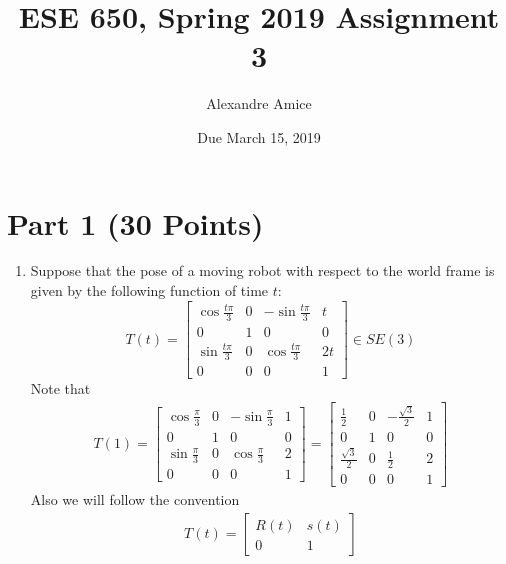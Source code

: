 \documentclass{article}
\title{ESE 650, Spring 2019 Assignment 3}
\date{Due March 15, 2019}
\author{Alexandre Amice}
\begin{document}
\maketitle

\section{Part 1 (30 Points)}

 
\begin{enumerate} 
  \item   Suppose that the pose of a moving robot with respect to the world frame is given by the following function of time $t$:
  \[
  T(t) = \begin{bmatrix}
    \cos\frac{t\pi}{3}  & 0 & -\sin\frac{t\pi}{3} & t\\
    0  &  1 &  0 &0\\
    \sin\frac{t\pi}{3} &  0 & \cos\frac{t\pi}{3} & 2t\\
    0 & 0 & 0 & 1
  \end{bmatrix} \in SE(3)
  \]
  Note that 
  \begin{align*}
   T(1) = \begin{bmatrix}
    \cos\frac{\pi}{3}  & 0 & -\sin\frac{\pi}{3} & 1\\
    0  &  1 &  0 &0\\
    \sin\frac{\pi}{3} &  0 & \cos\frac{\pi}{3} & 2\\
    0 & 0 & 0 & 1
  \end{bmatrix} = \begin{bmatrix}
    \frac{1}{2}  & 0 & -\frac{\sqrt{3}}{2} & 1\\
    0  &  1 &  0 &0\\
    \frac{\sqrt{3}}{2} &  0 & \frac{1}{2} & 2\\
    0 & 0 & 0 & 1
  \end{bmatrix}
  \end{align*}
  Also we will follow the convention
  \begin{align*}
   T(t) = \begin{bmatrix}
           R(t) & s(t) \\
           0 & 1
          \end{bmatrix}
  \end{align*}



\end{enumerate}
\end{document}
